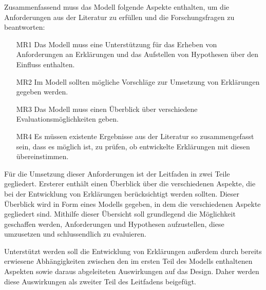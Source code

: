 \smallskip

Zusammenfassend muss das Modell folgende Aspekte enthalten, um die Anforderungen aus der Literatur zu erfüllen und die Forschungsfragen zu beantworten:

\begin{enumerate}
    \item[MR1] Das Modell muss eine Unterstützung für das Erheben von Anforderungen an Erklärungen und das Aufstellen von Hypothesen über den Einfluss enthalten.
    \item[MR2] Im Modell sollten mögliche Vorschläge zur Umsetzung von Erklärungen gegeben werden.
    \item[MR3] Das Modell muss einen Überblick über verschiedene Evaluationsmöglichkeiten geben.
    \item[MR4] Es müssen existente Ergebnisse aus der Literatur so zusammengefasst sein, dass es möglich ist, zu prüfen, ob entwickelte Erklärungen mit diesen übereinstimmen.
\end{enumerate}

\bigskip

Für die Umsetzung dieser Anforderungen ist der Leitfaden in zwei Teile gegliedert. Ersterer enthält einen Überblick über die verschiedenen Aspekte, die bei der Entwicklung von Erklärungen berücksichtigt werden sollten. Dieser Überblick wird in Form eines Modells gegeben, in dem die verschiedenen Aspekte gegliedert sind. Mithilfe dieser Übersicht soll grundlegend die Möglichkeit geschaffen werden, Anforderungen und Hypothesen aufzustellen, diese umzusetzen und schlussendlich zu evaluieren.

Unterstützt werden soll die Entwicklung von Erklärungen außerdem durch bereits erwiesene Abhängigkeiten zwischen den im ersten Teil des Modells enthaltenen Aspekten sowie daraus abgeleiteten Auswirkungen auf das Design. Daher werden diese Auswirkungen als zweiter Teil des Leitfadens beigefügt.

